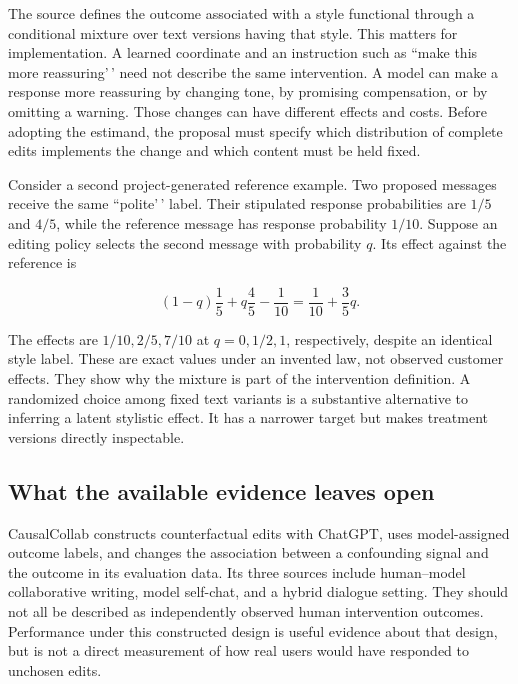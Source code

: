 The source defines the outcome associated with a style functional
through a conditional mixture over text versions having that style. This
matters for implementation. A learned coordinate and an instruction such
as ``make this more reassuring'\,' need not describe the same
intervention. A model can make a response more reassuring by changing
tone, by promising compensation, or by omitting a warning. Those changes
can have different effects and costs. Before adopting the estimand, the
proposal must specify which distribution of complete edits implements
the change and which content must be held fixed.

Consider a second project-generated reference example. Two proposed
messages receive the same ``polite'\,' label. Their stipulated response
probabilities are \(1/5\) and \(4/5\), while the reference message has
response probability \(1/10\). Suppose an editing policy selects the
second message with probability \(q\). Its effect against the reference
is

\[
 (1-q)\frac15+q\frac45-\frac1{10}
 =\frac1{10}+\frac35q.
\]

The effects are \(1/10,2/5,7/10\) at \(q=0,1/2,1\), respectively,
despite an identical style label. These are exact values under an
invented law, not observed customer effects. They show why the mixture
is part of the intervention definition. A randomized choice among fixed
text variants is a substantive alternative to inferring a latent
stylistic effect. It has a narrower target but makes treatment versions
directly inspectable.

\hypertarget{what-the-available-evidence-leaves-open}{%
\subsection{What the available evidence leaves
open}\label{what-the-available-evidence-leaves-open}}

CausalCollab constructs counterfactual edits with ChatGPT, uses
model-assigned outcome labels, and changes the association between a
confounding signal and the outcome in its evaluation data. Its three
sources include human--model collaborative writing, model self-chat, and
a hybrid dialogue setting. They should not all be described as
independently observed human intervention outcomes. Performance under
this constructed design is useful evidence about that design, but is not
a direct measurement of how real users would have responded to unchosen
edits. \cite{exec13_census_collaboration}

